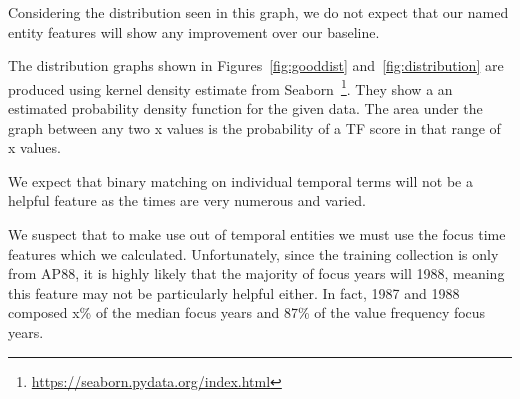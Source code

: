 \documentclass{mpaper}
\begin{document}
Considering the distribution seen in this graph, we do not expect that our named entity features will show any improvement over our baseline.

The distribution graphs shown in Figures~\ref{fig:gooddist} and~\ref{fig:distribution} are produced using  kernel density estimate from Seaborn~\footnote{\url{https://seaborn.pydata.org/index.html}}. They show a an estimated probability density function for the given data. The area under the graph between any two x values is the probability of a TF score in that range of x values.

We expect that binary matching on individual temporal terms will not be a helpful feature as the times are very numerous and varied.

We suspect that to make use out of temporal entities we must use the focus time features which we calculated. Unfortunately, since the training collection is only from AP88, it is highly likely that the majority of focus years will 1988, meaning this feature may not be particularly helpful either. In fact, 1987 and 1988 composed x\% of the median focus years and 87\% of the value frequency focus years.
\end{document}
